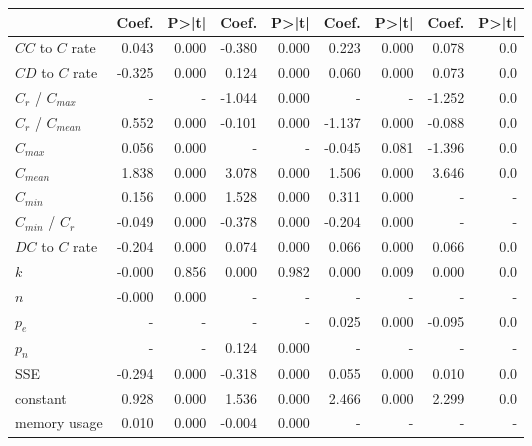\begin{tabular}{lrrrrrrrr}
\toprule
{} &  Coef. &  P>|t| &  Coef. &  P>|t| &  Coef. &  P>|t| &  Coef. &  P>|t| \\
\midrule
$CC$ to $C$ rate   &  0.043 &  0.000 & -0.380 &  0.000 &  0.223 &  0.000 &  0.078 &    0.0 \\
$CD$ to $C$ rate   & -0.325 &  0.000 &  0.124 &  0.000 &  0.060 &  0.000 &  0.073 &    0.0 \\
$C_r$ / $C_{max}$  &      - &      - & -1.044 &  0.000 &      - &      - & -1.252 &    0.0 \\
$C_r$ / $C_{mean}$ &  0.552 &  0.000 & -0.101 &  0.000 & -1.137 &  0.000 & -0.088 &    0.0 \\
$C_{max}$          &  0.056 &  0.000 &      - &      - & -0.045 &  0.081 & -1.396 &    0.0 \\
$C_{mean}$         &  1.838 &  0.000 &  3.078 &  0.000 &  1.506 &  0.000 &  3.646 &    0.0 \\
$C_{min}$          &  0.156 &  0.000 &  1.528 &  0.000 &  0.311 &  0.000 &      - &      - \\
$C_{min}$ / $C_r$  & -0.049 &  0.000 & -0.378 &  0.000 & -0.204 &  0.000 &      - &      - \\
$DC$ to $C$ rate   & -0.204 &  0.000 &  0.074 &  0.000 &  0.066 &  0.000 &  0.066 &    0.0 \\
$k$                & -0.000 &  0.856 &  0.000 &  0.982 &  0.000 &  0.009 &  0.000 &    0.0 \\
$n$                & -0.000 &  0.000 &      - &      - &      - &      - &      - &      - \\
$p_e$              &      - &      - &      - &      - &  0.025 &  0.000 & -0.095 &    0.0 \\
$p_n$              &      - &      - &  0.124 &  0.000 &      - &      - &      - &      - \\
SSE                & -0.294 &  0.000 & -0.318 &  0.000 &  0.055 &  0.000 &  0.010 &    0.0 \\
constant           &  0.928 &  0.000 &  1.536 &  0.000 &  2.466 &  0.000 &  2.299 &    0.0 \\
memory usage       &  0.010 &  0.000 & -0.004 &  0.000 &      - &      - &      - &      - \\
\bottomrule
\end{tabular}

